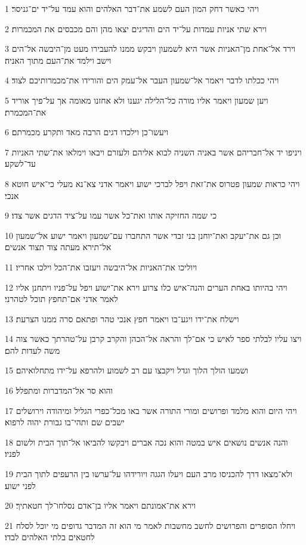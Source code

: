 \par 1 ויהי כאשר דחק המון העם לשמע את־דבר האלהים והוא עמד על־יד ים־גניסר׃
\par 2 וירא שתי אניות עמדות על־יד הים והדיגים יצאו מהן והם מכבסים את המכמרות׃
\par 3 וירד אל־אחת מן־האניות אשר היא לשמעון ויבקש ממנו להעבירו מעט מן־היבשה אל־הים וישב וילמד את־העם מתוך האניה׃
\par 4 ויהי ככלתו לדבר ויאמר אל־שמעון העבר אל־עמק הים והורידו את־מכמרותיכם לצוד׃
\par 5 ויען שמעון ויאמר אליו מורה כל־הלילה יגענו ולא אחזנו מאומה אך על־פיך אוריד את־המכמרת׃
\par 6 ויעשו־כן וילכדו דגים הרבה מאד ותקרע מכמרתם׃
\par 7 ויניפו יד אל־חבריהם אשר באניה השניה לבוא אליהם ולעזרם ויבאו וימלאו את־שתי האניות עד־לשקע׃
\par 8 ויהי כראות שמעון פטרוס את־זאת ויפל לברכי ישוע ויאמר אדני צא־נא מעלי כי־איש חוטא אנכי׃
\par 9 כי שמה החזיקה אותו ואת־כל אשר עמו על־ציד הדגים אשר צדו׃
\par 10 וכן גם את־יעקב ואת־יוחנן בני זבדי אשר התחברו עם־שמעון ויאמר ישוע אל־שמעון אל־תירא מעתה צוד תצוד אנשים׃
\par 11 ויוליכו את־האניות אל־היבשה ויעזבו את־הכל וילכו אחריו׃
\par 12 ויהי בהיותו באחת הערים והנה־איש כלו צרוע וירא את־ישוע ויפל על־פניו ויתחנן אליו לאמר אדני אם־תחפץ תוכל לטהרני׃
\par 13 וישלח את־ידו ויגע־בו ויאמר חפץ אנכי טהר ופתאם סרה ממנו הצרעת׃
\par 14 ויצו עליו לבלתי ספר לאיש כי אם־לך והראה אל־הכהן והקרב קרבן על־טהרתך כאשר צוה משה לעדות להם׃
\par 15 ושמעו הולך הלוך וגדל ויקבצו עם רב לשמוע ולהרפא על־ידו מתחלואיהם׃
\par 16 והוא סר אל־המדברות ומתפלל׃
\par 17 ויהי היום והוא מלמד ופרושים ומורי התורה אשר באו מכל־כפרי הגליל ומיהודה וירושלים ישבים שם ותהי־בו גבורת יהוה לרפוא׃
\par 18 והנה אנשים נושאים איש במטה והוא נכה אברים ויבקשו להביאו אל־תוך הבית ולשום לפניו׃
\par 19 ולא־מצאו דרך להכניסו מרב העם ויעלו הגגה ויורידהו על־ערשו בין הרעפים לתוך הבית לפני ישוע׃
\par 20 וירא את־אמונתם ויאמר אליו בן־אדם נסלחו־לך חטאתיך׃
\par 21 ויחלו הסופרים והפרושים לחשב מחשבות לאמר מי הוא זה המדבר גדופים מי יוכל לסלח לחטאים בלתי האלהים לבדו׃
